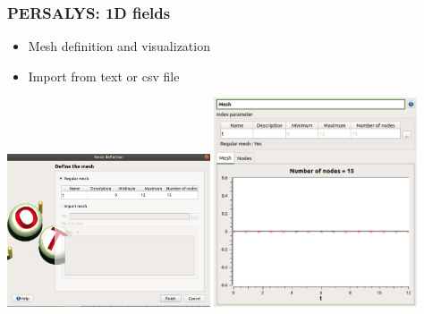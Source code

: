 \documentclass{beamer}
\begin{document}

\begin{frame}
\frametitle{PERSALYS: 1D fields}
	

\begin{itemize}
\item Mesh definition and visualization
\item Import from text or csv file
\end{itemize}

\begin{center}
\includegraphics[width=0.45\textwidth]{figures/persalys-field-define-mesh.png}
\includegraphics[width=0.45\textwidth]{figures/persalys-field-visualize-mesh-extract.png}
\end{center}

\end{frame}


\end{document}
